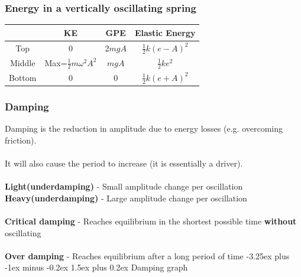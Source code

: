 \documentclass[12pt]{article}
\makeatletter
\renewcommand{\paragraph}{\@startsection{paragraph}{4}{0ex}%
    {-3.25ex plus -1ex minus -0.2ex}%
    {1.5ex plus 0.2ex}%
    {\normalfont\normalsize\bfseries}}
\makeatother
\begin{document}
\subsubsection{Energy in a vertically oscillating spring}
\begin{tabular}{|c|c|c|c|}
\hline
&KE&GPE&Elastic Energy\\
\hline
Top&0&$2mgA$&$\frac{1}{2}k(e-A)^2$\\
\hline
Middle&Max=$\frac{1}{2}m\omega^2A^2$&$mgA$&$\frac{1}{2}ke^2$\\
\hline
Bottom&0&0&$\frac{1}{2}k(e+A)^2$\\
\hline
\end{tabular}



\subsubsection{Damping}
Damping is the reduction in amplitude due to energy losses (e.g. overcoming friction).\\
\\
It will also cause the period to increase (it is essentially a driver).\\
\\
\textbf{Light(underdamping)} - Small amplitude change per oscillation\\
\textbf{Heavy(underdamping)} - Large amplitude change per oscillation\\
\\
\textbf{Critical damping} - Reaches equilibrium in the shortest possible time \textbf{without} oscillating\\
\\
\textbf{Over damping} - Reaches equilibrium after a long period of time
\paragraph{Damping graph}
\end{document}
